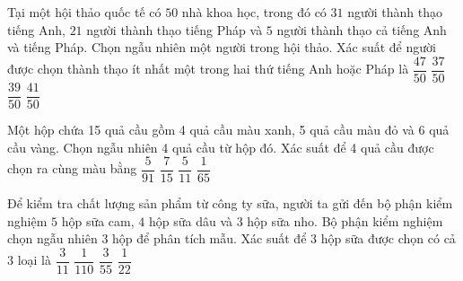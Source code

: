 \begin{ex}%
	Tại một hội thảo quốc tế có $50$ nhà khoa học, trong đó có $31$ người thành thạo tiếng Anh, $21$ người thành thạo tiếng Pháp và $5$ người thành thạo cả tiếng Anh và tiếng Pháp. Chọn ngẫu nhiên một người trong hội thảo. Xác suất để người được chọn thành  thạo ít nhất một trong hai thứ tiếng Anh hoặc Pháp là
	 \choice
		 {\True$\dfrac{47}{50}$}
		 {$\dfrac{37}{50}$}
		 {$\dfrac{39}{50}$}
		 {$\dfrac{41}{50}$}
\end{ex}

\begin{ex}%
	Một hộp chứa 15 quả cầu gồm 4 quả cầu màu xanh, 5 quả cầu màu đỏ  và 6 quả cầu vàng. Chọn ngẫu nhiên 4 quả cầu từ hộp đó. Xác suất để 4 quả cầu được chọn ra cùng màu bằng
	 \choice
		{$\dfrac{5}{91}$} 
		 {$\dfrac{7}{15}$}
		 {$\dfrac{5}{11}$}
		{\True $\dfrac{1}{65}$} 
\end{ex}

\begin{ex}%
	Để kiểm tra chất lượng sản phẩm từ công ty sữa, người ta gửi đến bộ phận kiểm nghiệm $5$ hộp sữa cam,  $4$ hộp sữa dâu và $3$ hộp sữa nho. Bộ phận kiểm nghiệm chọn ngẫu nhiên $3$ hộp để phân tích mẫu. Xác suất để $3$ hộp sữa được chọn có cả $3$ loại là
	 \choice
		{\True  $\dfrac{3}{11}$}
		{$\dfrac{1}{110}$} 
		{$\dfrac{3}{55}$} 
		 {$\dfrac{1}{22}$}
\end{ex}

